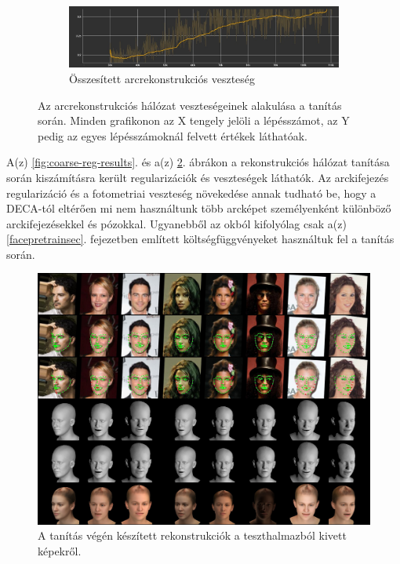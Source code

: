 \documentclass[12pt,a4]{article}
\begin{document}
\begin{figure}[h!]
            \begin{subfigure}[b]{0.55\textwidth}
               \includegraphics[width=1\linewidth]{coarse-all-loss.jpg}
               \caption{Összesített arcrekonstrukciós veszteség}
               \label{fig:coarse-all-loss} 
            \end{subfigure}
            \caption{Az arcrekonstrukciós hálózat veszteségeinek alakulása a tanítás során. Minden grafikonon az X tengely jelöli a lépésszámot, az Y pedig az egyes lépésszámoknál felvett értékek láthatóak.}
            \label{fig:coarse-loss-results}
        \end{figure}\clearpage

        A(z) \ref{fig:coarse-reg-results}. és a(z) \ref{fig:coarse-loss-results}. ábrákon a rekonstrukciós hálózat tanítása során kiszámításra került regularizációk és veszteségek láthatók. Az arckifejezés regularizáció és a fotometriai veszteség növekedése annak tudható be, hogy a DECA-tól eltérően mi nem használtunk több arcképet személyenként különböző arckifejezésekkel és pózokkal. Ugyanebből az okból kifolyólag csak a(z) \ref{facepretrainsec}. fejezetben említett költségfüggvényeket használtuk fel a tanítás során.

        \begin{figure}[h!]	
            \centering
            \includegraphics[width=1\linewidth]{coarse-val-image.jpg}
            \caption{A tanítás végén készített rekonstrukciók a teszthalmazból kivett képekről.}
            \label{fig:coarse-val-images}
        \end{figure}
        
\end{document}
